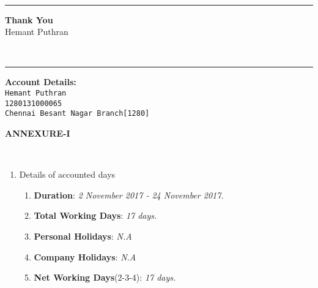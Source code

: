 \documentclass[]{invoice-style}
\begin{document}
\begin{minipage}[t][60em][c]{\textwidth}
\begin{minipage}[][][t]{\textwidth}
	\end{minipage}
		\vspace*{.25em}\\

\vfill
\hrule
	\begin{minipage}[][10em][b]{\textwidth}
	\begin{flushleft}
	{\large \bfseries Thank You}\vspace{.15cm}\\
	{\large  Hemant Puthran}
\end{flushleft}
	\end{minipage}\vspace*{1em}\\
\hrule
	\begin{minipage}[][7em][c]{\textwidth}
	\begin{flushleft}
{\large \bfseries Account Details:}\vspace{.15cm}\\
{\tt \large Hemant Puthran}\\
{\tt \large 1280131000065}\\
{\tt \large Chennai Besant Nagar Branch[1280]}\\


\end{flushleft}
	\end{minipage}

\end{minipage}
\newpage
	\begin{minipage}[][][c]{\textwidth}
		\begin{minipage}[][][c]{\textwidth}
	\begin{center}
	{\Large \textbf{ANNEXURE-\RN{1}}}
	\end{center}
	\end{minipage}
	\vspace{.35cm}\\

	\begin{minipage}[][][c]{\textwidth}
	\begin{enumerate}
		\item Details of accounted days
		\begin{enumerate}[topsep=0pt]\setlength{\itemsep}{0pt}
    \setlength{\parskip}{0pt}
    \setlength{\parsep}{0pt}
\item {\bfseries Duration}: {\itshape 2 November 2017 - 24 November 2017.}
\item {\bfseries Total Working Days}: {\itshape 17 days.}
\item {\bfseries Personal Holidays}: {\itshape N.A}
\item {\bfseries Company Holidays}: {\itshape N.A}
\item {\bfseries Net Working Days}(2-3-4): {\itshape 17 days.}
\end{enumerate}
	\end{enumerate}
	\end{minipage}
	\end{minipage}
\end{document}
